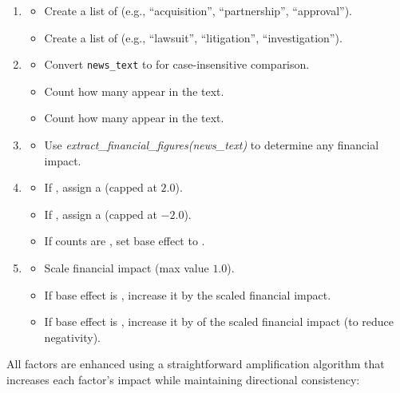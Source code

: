 \documentclass[3p,times,procedia]{elsarticle}
\begin{document}
\begin{enumerate}
    \item {}
    \begin{itemize}
        \item Create a list of  (e.g., ``acquisition'', ``partnership'', ``approval'').
        \item Create a list of  (e.g., \allowbreak``lawsuit'', ``litigation'', ``investigation'').
    \end{itemize}

    \item {}
    \begin{itemize}
        \item Convert \texttt{news\_text} to  for case-insensitive comparison.
        \item Count how many  appear in the text.
        \item Count how many  appear in the text.
    \end{itemize}

    \item {}
    \begin{itemize}
        \item Use \textit{extract\_financial\_figures(news\_text)} to determine any financial impact.
    \end{itemize}

    \item {}
    \begin{itemize}
        \item If , assign a  (capped at $2.0$).
        \item If , assign a  (capped at $-2.0$).
        \item If counts are , set base effect to .
    \end{itemize}

    \item {}
    \begin{itemize}
        \item Scale financial impact (max value $1.0$).
        \item If base effect is , increase it by the scaled financial impact.
        \item If base effect is , increase it by  of the scaled financial impact (to reduce negativity).
    \end{itemize}

\end{enumerate}
All factors are enhanced using a straightforward amplification algorithm that increases each factor's impact while maintaining directional consistency:
\end{document}
